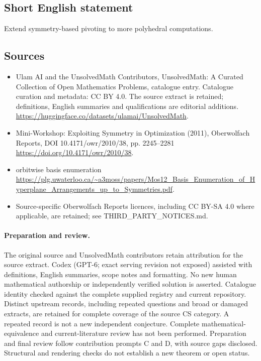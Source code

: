 \documentclass[11pt]{article}
\begin{document}
\subsection{Short English statement}
Extend symmetry-based pivoting to more polyhedral computations.
\subsection{Sources}
\begin{itemize}
\item[\hypertarget{source:statement:1}{S1}] Ulam AI and the UnsolvedMath Contributors, UnsolvedMath: A Curated Collection of Open Mathematics Problems, catalogue entry. Catalogue curation and metadata: CC BY 4.0. The source extract is retained; definitions, English summaries and qualifications are editorial additions.
\url{https://huggingface.co/datasets/ulamai/UnsolvedMath}.
\item[\hypertarget{source:statement:2}{S2}] Mini-Workshop: Exploiting Symmetry in Optimization (2011), Oberwolfach Reports, DOI 10.4171/owr/2010/38, pp. 2245--2281
\url{https://doi.org/10.4171/owr/2010/38}.
\item[\hypertarget{source:statement:3}{S3}] orbitwise basis enumeration
\url{https://plg.uwaterloo.ca/~a3moss/papers/Mos12_Basis_Enumeration_of_Hyperplane_Arrangements_up_to_Symmetries.pdf}.
\item Source-specific Oberwolfach Reports licences, including CC BY-SA 4.0 where applicable, are retained; see THIRD\_PARTY\_NOTICES.md.
\end{itemize}
\paragraph{Preparation and review.}
The original source and UnsolvedMath contributors retain attribution for the source extract. Codex (GPT-6; exact serving revision not exposed) assisted with definitions, English summaries, scope notes and formatting. No new human mathematical authorship or independently verified solution is asserted. Catalogue identity checked against the complete supplied registry and current repository. Distinct upstream records, including repeated questions and broad or damaged extracts, are retained for complete coverage of the source CS category. A repeated record is not a new independent conjecture. Complete mathematical-equivalence and current-literature review has not been performed. Preparation and final review follow contribution prompts C and D, with source gaps disclosed. Structural and rendering checks do not establish a new theorem or open status.
\label{end:statement}
\end{document}
